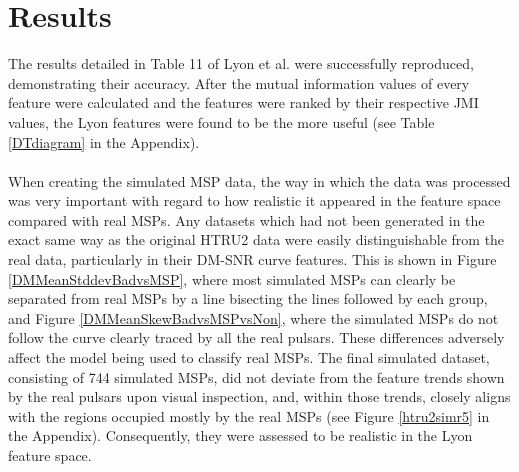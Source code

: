 \documentclass[12pt]{article}
\begin{document}
\section{Results}
The results detailed in Table 11 of Lyon et al. \cite{lyon2016fifty} were successfully reproduced, demonstrating their accuracy. After the mutual information values of every feature were calculated and the features were ranked by their respective JMI values, the Lyon features were found to be the more useful (see Table \ref{DTdiagram} in the Appendix).
\paragraph{}
When creating the simulated MSP data, the way in which the data was processed was very important with regard to how realistic it appeared in the feature space compared with real MSPs. Any datasets which had not been generated in the exact same way as the original HTRU2 data were easily distinguishable from the real data, particularly in their DM-SNR curve features. This is shown in Figure \ref{DMMeanStddevBadvsMSP}, where most simulated MSPs can clearly be separated from real MSPs by a line bisecting the lines followed by each group, and Figure \ref{DMMeanSkewBadvsMSPvsNon}, where the simulated MSPs do not follow the curve clearly traced by all the real pulsars. These differences adversely affect the model being used to classify real MSPs. The final simulated dataset, consisting of 744 simulated MSPs, did not deviate from the feature trends shown by the real pulsars upon visual inspection, and, within those trends, closely aligns with the regions occupied mostly by the real MSPs (see Figure \ref{htru2simr5} in the Appendix). Consequently, they were assessed to be realistic in the Lyon feature space.
\end{document}
